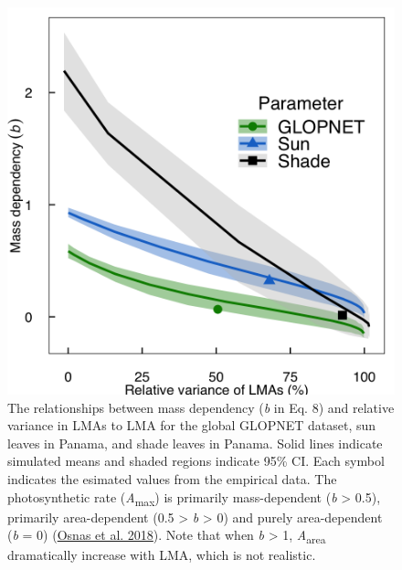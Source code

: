 \documentclass[
  12pt,
]{article}
\providecommand{\DIFaddbeginFL}{} %
\providecommand{\DIFaddendFL}{} %
\providecommand{\DIFdelbeginFL}{} %
\providecommand{\DIFdelendFL}{} %
\newcommand{\DIFscaledelfig}{0.5}
\newlength{\DIFdelgraphicswidth} %
\newlength{\DIFdelgraphicsheight} %
\newcommand{\DIFaddincludegraphics}[2][]{{\color{blue}\fbox{\DIFOincludegraphics[#1]{#2}}}} %
\newcommand{\DIFdelincludegraphics}[2][]{%
\sbox{\DIFdelgraphicsbox}{\DIFOincludegraphics[#1]{#2}}%
\settoboxwidth{\DIFdelgraphicswidth}{\DIFdelgraphicsbox} %
\settoboxtotalheight{\DIFdelgraphicsheight}{\DIFdelgraphicsbox} %
\scalebox{\DIFscaledelfig}{%
\parbox[b]{\DIFdelgraphicswidth}{\usebox{\DIFdelgraphicsbox}\\[-\baselineskip] \rule{\DIFdelgraphicswidth}{0em}}\llap{\resizebox{\DIFdelgraphicswidth}{\DIFdelgraphicsheight}{%
\setlength{\unitlength}{\DIFdelgraphicswidth}%
\begin{picture}(1,1)%
\thicklines\linethickness{2pt} %
{\color[rgb]{1,0,0}\put(0,0){\framebox(1,1){}}}%
{\color[rgb]{1,0,0}\put(0,0){\line( 1,1){1}}}%
{\color[rgb]{1,0,0}\put(0,1){\line(1,-1){1}}}%
\end{picture}%
}\hspace*{3pt}}} %
} %
\DeclareRobustCommand{\DIFaddbeginFL}{\DIFOaddbeginFL \let\includegraphics\DIFaddincludegraphics} %
\DeclareRobustCommand{\DIFaddendFL}{\DIFOaddendFL \let\includegraphics\DIFOincludegraphics} %
\DeclareRobustCommand{\DIFdelbeginFL}{\DIFOdelbeginFL \let\includegraphics\DIFdelincludegraphics} %
\DeclareRobustCommand{\DIFdelendFL}{\DIFOaddendFL \let\includegraphics\DIFOincludegraphics} %
\begin{document}
\begin{figure}
\DIFdelbeginFL %
\DIFdelendFL \DIFaddbeginFL \hypertarget{fig:massplt}{%
\centering
\includegraphics{../figs/mass_prop_simple.png}
\caption{The relationships between mass dependency (\emph{b} in Eq. 8) and relative variance in LMAs to LMA for the global GLOPNET dataset, sun leaves in Panama, and shade leaves in Panama.
Solid lines indicate simulated means and shaded regions indicate 95\% CI.
Each symbol indicates the esimated values from the empirical data.
The photosynthetic rate (\emph{A}\textsubscript{max}) is primarily mass-dependent (\emph{b} \textgreater{} 0.5), primarily area-dependent (0.5 \textgreater{} \emph{b} \textgreater{} 0) and purely area-dependent (\emph{b} = 0) (\protect\hyperlink{ref-Osnas2018}{Osnas et al. 2018}).
Note that when \emph{b} \textgreater{} 1, \emph{A}\textsubscript{area} dramatically increase with LMA, which is not realistic.}\label{fig:massplt}
}
\DIFaddendFL \end{figure}
\end{document}

